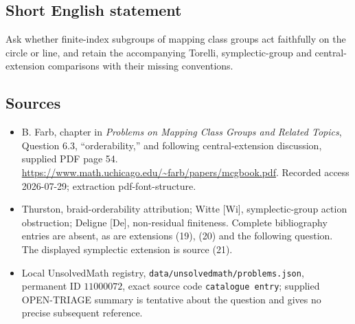 \documentclass[11pt]{article}
\begin{document}
\subsection{Short English statement}
Ask whether finite-index subgroups of mapping class groups act faithfully on the circle or line, and retain the accompanying Torelli, symplectic-group and central-extension comparisons with their missing conventions.
\subsection{Sources}
\begin{itemize}
\item B. Farb, chapter in \emph{Problems on Mapping Class Groups and Related Topics}, Question 6.3, ``orderability,'' and following central-extension discussion, supplied PDF page 54. \url{https://www.math.uchicago.edu/~farb/papers/mcgbook.pdf}. Recorded access 2026-07-29; extraction pdf-font-structure.
\item Thurston, braid-orderability attribution; Witte [Wi], symplectic-group action obstruction; Deligne [De], non-residual finiteness. Complete bibliography entries are absent, as are extensions (19), (20) and the following question. The displayed symplectic extension is source (21).
\item Local UnsolvedMath registry, \texttt{data/unsolvedmath/problems.json}, permanent ID \(11000072\), exact source code \texttt{catalogue entry}; supplied OPEN-TRIAGE summary is tentative about the question and gives no precise subsequent reference.
\end{itemize}
\end{document}
